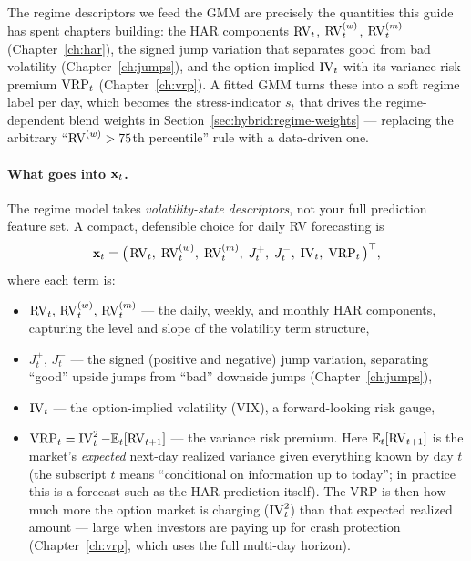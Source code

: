 \begin{definition}
\begin{projectconnection}
The regime descriptors we feed the GMM are precisely the quantities this
guide has spent chapters building: the HAR components $\operatorname{RV}_t$,
$\operatorname{RV}_t^{(w)}$, $\operatorname{RV}_t^{(m)}$ (Chapter~\ref{ch:har}), the signed jump
variation that separates good from bad volatility
(Chapter~\ref{ch:jumps}), and the option-implied $\operatorname{IV}_t$ with its
variance risk premium $\operatorname{VRP}_t$ (Chapter~\ref{ch:vrp}).  A fitted GMM turns
these into a soft regime label per day, which becomes the
stress-indicator $s_t$ that drives the regime-dependent blend weights in
Section~\ref{sec:hybrid:regime-weights} --- replacing the arbitrary
``$\operatorname{RV}^{(w)} > 75$th percentile'' rule with a data-driven one.
\end{projectconnection}
\end{definition}

\paragraph{What goes into $\mathbf{x}_t$.}
The regime model takes \emph{volatility-state descriptors}, not your full
prediction feature set.  A compact, defensible choice for daily
RV forecasting is
\begin{equation}\label{eq:hybrid:regime-inputs}
  \mathbf{x}_t = \bigl(\,\operatorname{RV}_t,\;\operatorname{RV}_t^{(w)},\;\operatorname{RV}_t^{(m)},\;
    J_t^{+},\;J_t^{-},\;\operatorname{IV}_t,\;\operatorname{VRP}_t\,\bigr)^\top,
\end{equation}
where each term is:
\begin{itemize}
  \item $\operatorname{RV}_t,\,\operatorname{RV}_t^{(w)},\,\operatorname{RV}_t^{(m)}$ --- the daily, weekly, and
        monthly HAR components, capturing the level and slope of the
        volatility term structure,
  \item $J_t^{+},\,J_t^{-}$ --- the signed (positive and negative) jump
        variation, separating ``good'' upside jumps from ``bad'' downside
        jumps (Chapter~\ref{ch:jumps}),
  \item $\operatorname{IV}_t$ --- the option-implied volatility (VIX), a
        forward-looking risk gauge,
  \item $\operatorname{VRP}_t = \operatorname{IV}_t^2 - \mathbb{E}_t[\operatorname{RV}_{t+1}]$ --- the variance risk
        premium.  Here $\mathbb{E}_t[\operatorname{RV}_{t+1}]$ is the market's \emph{expected}
        next-day realized variance given everything known by day $t$ (the
        subscript $t$ means ``conditional on information up to today''; in
        practice this is a forecast such as the HAR prediction itself). The
        VRP is then how much more the option market is charging
        ($\operatorname{IV}_t^2$) than that expected realized amount --- large when
        investors are paying up for crash protection
        (Chapter~\ref{ch:vrp}, which uses the full multi-day horizon).
\end{itemize}

